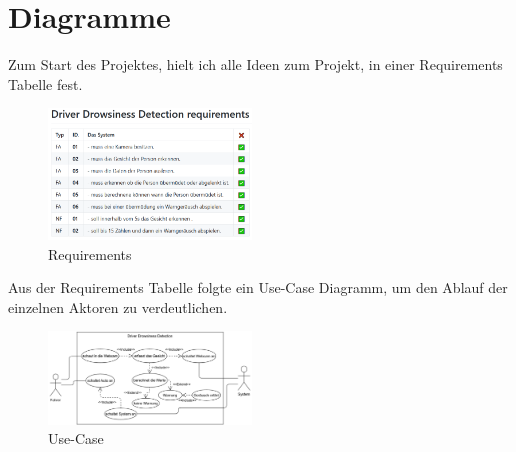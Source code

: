  \section{Diagramme}
 
Zum Start des Projektes, hielt ich alle Ideen zum Projekt, in einer Requirements Tabelle fest. 
 
 \begin{figure}[htbp]
  \centering
     \includegraphics[width=0.48\textwidth]{DLReq.png}
     \caption{Requirements}
\end{figure}


Aus der Requirements Tabelle folgte ein Use-Case Diagramm, um den Ablauf der einzelnen Aktoren zu verdeutlichen.

\begin{figure}[htbp]
  \centering
     \includegraphics[width=0.48\textwidth]{UseCaseDL.png}
     \caption{Use-Case}
\end{figure}